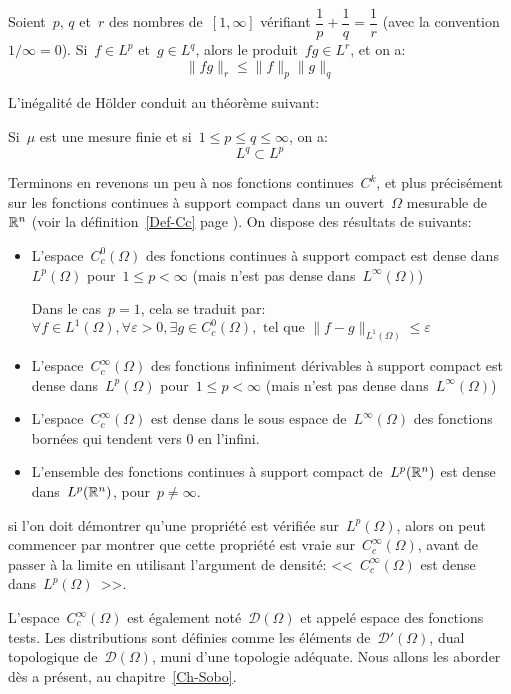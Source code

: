 \begin{theoreme}
Soient~$p$, $q$ et~$r$ des nombres de~$[1,\infty]$ vérifiant
$\dfrac1p+\dfrac1q=\dfrac1r$ (avec la convention~$1/\infty=0$).
Si~$f\in L^p$ et~$g\in L^q$, alors le produit~$fg\in L^r$, et on a:
\begin{equation}\|fg\|_r\le\|f\|_p\|g\|_q\end{equation}
\end{theoreme}

L'inégalité de Hölder conduit au théorème suivant:
\begin{theoreme}
Si~$\mu$ est une mesure finie et si~$1\le p\le q\le \infty$, on a:
\begin{equation}L^q\subset L^p\end{equation}
\end{theoreme}

\medskip
Terminons en revenons un peu à nos fonctions continues~$C^k$, et plus précisément sur les fonctions continues à support compact
dans un ouvert~$\Omega$ mesurable de~$\mathbb R^n$ (voir la définition~\ref{Def-Cc} page \pageref{Def-Cc}).
On dispose des résultats de  suivants:
\begin{itemize}
  \item L'espace~$C_c^0(\Omega)$ des fonctions continues à support compact est dense dans~$L^p(\Omega)$ pour~$1\le p<\infty$
	(mais n'est pas dense dans~$L^\infty(\Omega)$)

	 Dans le cas~$p=1$, cela se traduit par: 	$ \forall f\in L^1(\Omega), \forall\varepsilon>0, \exists g\in C_ c^0(\Omega), \text{ tel que }
	  \|f-g\|_{L^1(\Omega)}\le\varepsilon$ 

  \item L'espace~$C_c^\infty(\Omega)$ des fonctions infiniment dérivables à support compact est dense dans~$L^p(\Omega)$ pour~$1\le p<\infty$
	(mais n'est pas dense dans~$L^\infty(\Omega)$)
  \item L'espace~$C_c^\infty(\Omega)$ est dense dans le sous espace de~$L^\infty(\Omega)$ des fonctions bornées qui tendent vers 0 en l'infini.
  \item L'ensemble des fonctions continues à support compact de~$L^p(\mathbb R^n)$ est dense dans~$L^p(\mathbb R^n)$, pour~$ p\neq \infty$. 
\end{itemize}

si l'on doit démontrer qu'une propriété est vérifiée sur~$L^p(\Omega)$, alors on peut commencer par montrer que cette propriété est 
vraie sur~$C_c^\infty(\Omega)$, avant de passer à la limite en utilisant l'argument de densité:
<<~$C_c^\infty(\Omega)$ est dense dans~$L^p(\Omega)$~>>.

\medskip
L'espace~$C_c^{\infty}(\Omega)$ est également noté~$\mathcal{D}(\Omega)$ et appelé espace des fonctions tests. 
Les distributions sont définies comme les éléments de~$\mathcal{D}'(\Omega)$, dual topologique de~$\mathcal{D}(\Omega)$, 
muni d'une topologie adéquate.
Nous allons les aborder dès a présent, au chapitre~\ref{Ch-Sobo}.
